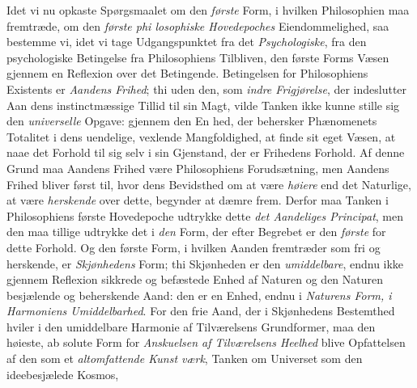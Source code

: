 Idet vi nu opkaste Spørgsmaalet om den \emph{første} Form,
i hvilken Philosophien maa fremtræde, om den \emph{første phi\-%
losophiske Hovedepoches} Eiendommelighed, saa bestemme
 \setcounter{footnote}{0}%
vi, idet vi tage Udgangspunktet fra det \emph{Psychologiske}, fra
den psychologiske Betingelse fra Philosophiens Tilbliven, den
første Forms Væsen gjennem en Reflexion over det Betingende.
Betingelsen for Philosophiens Existents er \emph{Aandens Frihed};
thi uden den, som \emph{indre Frigjørelse}, der indeslutter Aan\-%
dens instinctmæssige Tillid til sin Magt, vilde Tanken ikke
kunne stille sig den \emph{universelle} Opgave: gjennem den En\-%
hed, der behersker Phænomenets Totalitet i dens uendelige,
vexlende Mangfoldighed, at finde sit eget Væsen, at naae det
Forhold til sig selv i sin Gjenstand, der er Frihedens Forhold.
Af denne Grund maa Aandens Frihed være Philosophiens
Forudsætning, men Aandens Frihed bliver først til, hvor dens
Bevidsthed om at være \emph{høiere} end det Naturlige, at være
\emph{herskende} over dette, begynder at dæmre frem. Derfor maa
Tanken i Philosophiens første Hovedepoche udtrykke dette
\emph{det Aandeliges Principat}, men den maa tillige udtrykke
det i \emph{den} Form, der efter Begrebet er den \emph{første} for dette
Forhold. Og den første Form, i hvilken Aanden fremtræder
som fri og herskende, er \emph{Skjønhedens} Form; thi Skjønheden
er den \emph{umiddelbare}, endnu ikke gjennem Reflexion sikkrede
og befæstede Enhed af Naturen og den Naturen besjælende
og beherskende Aand: den er en Enhed, endnu i \emph{Naturens
Form, i Harmoniens Umiddelbarhed}. For den frie
Aand, der i Skjønhedens Bestemthed hviler i den umiddelbare
Harmonie af Tilværelsens Grundformer, maa den høieste, ab\-%
solute Form for \emph{Anskuelsen af Tilværelsens Heelhed}
blive Opfattelsen af den som et \emph{altomfattende Kunst\-%
værk}, Tanken om Universet som den ideebesjælede Kosmos,
